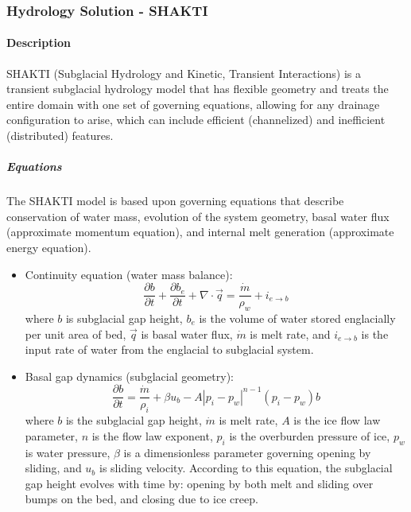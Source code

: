 
\subsubsection{Hydrology Solution - SHAKTI} \label{sec:using-issm-capabilities-hydrology-shakti}
\paragraph{Description}
SHAKTI (Subglacial Hydrology and Kinetic, Transient Interactions) is a transient subglacial hydrology model that has flexible geometry and treats the entire domain with one set of governing equations, allowing for any drainage configuration to arise, which can include efficient (channelized) and inefficient (distributed) features. \citep{Sommers2018}

\subparagraph{Equations}
The SHAKTI model is based upon governing equations that describe conservation of water mass, evolution of the system geometry, basal water flux (approximate momentum equation), and internal melt generation (approximate energy equation).

\begin{itemize}
	\item Continuity equation (water mass balance):
	\begin{equation}\frac{\partial b}{\partial t}+\frac{\partial b_e}{\partial t}+\nabla \cdot \vec{q}=\frac{\dot m}{\rho_w}+i_{e\rightarrow b}\end{equation}
	where $b$ is subglacial gap height, $b_e$ is the volume of water stored englacially per unit area of bed, $\vec{q}$ is basal water flux, $\dot{m}$ is melt rate, and $i_{e\rightarrow b}$ is the input rate of water from the englacial to subglacial system.
\end{itemize}

\begin{itemize}
	\item Basal gap dynamics (subglacial geometry):
	\begin{equation}\frac{\partial b}{\partial t}=\frac{\dot{m}}{\rho_i}+\beta u_b-A|p_i-p_w|^{n-1}(p_i-p_w)b\end{equation}
	where $b$ is the subglacial gap height, $\dot{m}$ is melt rate, $A$ is the ice flow law parameter, $n$ is the flow law exponent, $p_i$ is the overburden pressure of ice, $p_w$ is water pressure, $\beta$ is a dimensionless parameter governing opening by sliding, and $u_b$ is sliding velocity. According to this equation, the subglacial gap height evolves with time by: opening by both melt and sliding over bumps on the bed, and closing due to ice creep.
\end{itemize}

